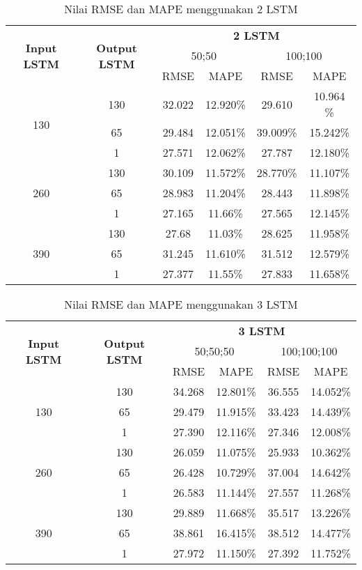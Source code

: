 \documentclass[../thesis.tex]{subfiles}
\begin{document}
\begin{table}[htp]
	\centering
	\begin{tabular}{|c|c|c|c|c|c|}
		\hline 
		\multirow{3}{*}{\textbf{Input LSTM}} & \multirow{3}{*}{\textbf{Output LSTM}} & \multicolumn{4}{c|}{\textbf{2 LSTM}} \\ \cline{3-6}
		&  & \multicolumn{2}{c|}{50;50}& \multicolumn{2}{c|}{100;100} \\ \cline{3-6}
		& & RMSE & MAPE& RMSE & MAPE\\
		\hline
		\multirow{3}{*}{130} & 130 & 32.022 & 12.920\% & 29.610 & 10.964 \%\\
		& 65 & 29.484 & 12.051\%& 39.009\% & 15.242\% \\
		& 1 & 27.571 & 12.062\% & 27.787 & 12.180\% \\
		\hline
		\multirow{3}{*}{260} & 130 & 30.109 & 11.572\% & 28.770\% & 11.107\% \\
		& 65 & 28.983 & 11.204\% & 28.443 & 11.898\% \\
		& 1 & 27.165 & 11.66\% & 27.565 & 12.145\% \\
		\hline
		\multirow{3}{*}{390} & 130 & 27.68 & 11.03\% & 28.625 & 11.958\% \\
		& 65 & 31.245 & 11.610\% & 31.512 & 12.579\% \\
		& 1 & 27.377 & 11.55\% & 27.833 & 11.658\% \\
		\hline
	\end{tabular}
	\caption{Nilai RMSE dan MAPE menggunakan 2 LSTM}
	\label{2LSTM_result}
	\end{table} 

\begin{table}[htp]
	\centering
	\begin{tabular}{|c|c|c|c|c|c|}
		\hline 
		\multirow{3}{*}{\textbf{Input LSTM}} & \multirow{3}{*}{\textbf{Output LSTM}} & \multicolumn{4}{c|}{\textbf{3 LSTM}} \\ \cline{3-6}
		&  & \multicolumn{2}{c|}{50;50;50}& \multicolumn{2}{c|}{100;100;100} \\ \cline{3-6}
		& & RMSE & MAPE& RMSE & MAPE\\
		\hline
		\multirow{3}{*}{130} & 130 & 34.268 & 12.801\% & 36.555 & 14.052\% \\
		& 65 & 29.479 & 11.915\% & 33.423 & 14.439\% \\
		& 1 & 27.390 & 12.116\% & 27.346 & 12.008\% \\
		\hline
		\multirow{3}{*}{260} & 130 & 26.059 & 11.075\% & 25.933 & 10.362\% \\
		& 65 & 26.428 & 10.729\% & 37.004 & 14.642\% \\
		& 1 & 26.583 & 11.144\% &  27.557 & 11.268\% \\
		\hline
		\multirow{3}{*}{390} & 130 & 29.889 & 11.668\% & 35.517 & 13.226\% \\
		& 65 & 38.861 & 16.415\% & 38.512 & 14.477\% \\
		& 1 & 27.972 & 11.150\% & 27.392 & 11.752\% \\
		\hline
	\end{tabular}
	\caption{Nilai RMSE dan MAPE menggunakan 3 LSTM}
	\label{3LSTM_result}
	\end{table} 
\end{document}
